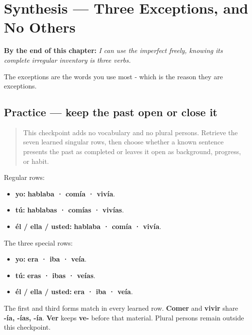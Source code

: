 
\chapter{Synthesis --- Three Exceptions, and No Others}
\label{ch:spanish-synthesis-imperfecto}

\begin{chapteropening}
\textbf{By the end of this chapter:} \emph{I can use the imperfect freely, knowing its complete irregular inventory is three verbs.}

The exceptions are the words you use most - which is the reason they are exceptions.
\end{chapteropening}

\section[Practice]{Practice — keep the past open or close it}

\label{lesson:ES-C16-practice}



\begin{quote}
This checkpoint adds no vocabulary and no plural persons. Retrieve the seven learned singular rows, then choose whether a known sentence presents the past as completed or leaves it open as background, progress, or habit.
\end{quote}

\begin{grammarlens}[title={Grammar Lens: the complete frame for this chapter}]
Regular rows:

\begin{itemize}
\raggedright
  \item \textbf{yo:} \textbf{hablaba · comía · vivía}.
  \item \textbf{tú:} \textbf{hablabas · comías · vivías}.
  \item \textbf{él / ella / usted:} \textbf{hablaba · comía · vivía}.
\end{itemize}

The three special rows:

\begin{itemize}
\raggedright
  \item \textbf{yo:} \textbf{era · iba · veía}.
  \item \textbf{tú:} \textbf{eras · ibas · veías}.
  \item \textbf{él / ella / usted:} \textbf{era · iba · veía}.
\end{itemize}

The first and third forms match in every learned row. \textbf{Comer} and \textbf{vivir} share \textbf{-ía, -ías, -ía}. \textbf{Ver} keeps \textbf{ve-} before that material. Plural persons remain outside this checkpoint.
\end{grammarlens}

